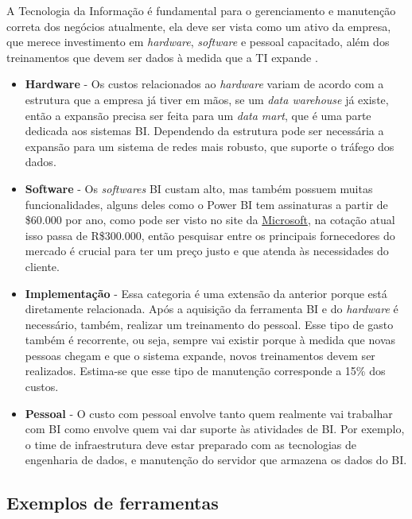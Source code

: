 A Tecnologia da Informação é fundamental para o gerenciamento e manutenção correta dos negócios atualmente, ela deve ser vista como um ativo da empresa, que merece investimento em \textit{hardware}, \textit{software} e pessoal capacitado, além dos treinamentos que devem ser dados à medida que a TI expande \cite{negash1}.

\begin{itemize}
	\item \textbf{Hardware} - Os custos relacionados ao \textit{hardware} variam de acordo com a estrutura que a empresa já tiver em mãos, se um \textit{data warehouse} já existe, então a expansão precisa ser feita para um \textit{data mart}, que é uma parte dedicada aos sistemas BI. Dependendo da estrutura pode ser necessária a expansão para um sistema de redes mais robusto, que suporte o tráfego dos dados.
	
	\item \textbf{Software} - Os \textit{softwares} BI custam alto, mas também possuem muitas funcionalidades, alguns deles como o Power BI tem assinaturas a partir de \$60.000 por ano, como pode ser visto no site da \href{https://powerbi.microsoft.com/en-us/pricing/}{Microsoft}, na cotação atual isso passa de R\$300.000, então pesquisar entre os principais fornecedores do mercado é crucial para ter um preço justo e que atenda às necessidades do cliente.
	
	\item \textbf{Implementação} - Essa categoria é uma extensão da anterior porque está diretamente relacionada. Após a aquisição da ferramenta BI e do \textit{hardware} é necessário, também, realizar um treinamento do pessoal. Esse tipo de gasto também é recorrente, ou seja, sempre vai existir porque à medida que novas pessoas chegam e que o sistema expande, novos treinamentos devem ser realizados. Estima-se que esse tipo de manutenção corresponde a 15\% dos custos.
	
	\item \textbf{Pessoal} - O custo com pessoal envolve tanto quem realmente vai trabalhar com BI como envolve quem vai dar suporte às atividades de BI. Por exemplo, o time de infraestrutura deve estar preparado com as tecnologias de engenharia de dados, e manutenção do servidor que armazena os dados do BI.
	
\end{itemize}

\subsection{Exemplos de ferramentas}

